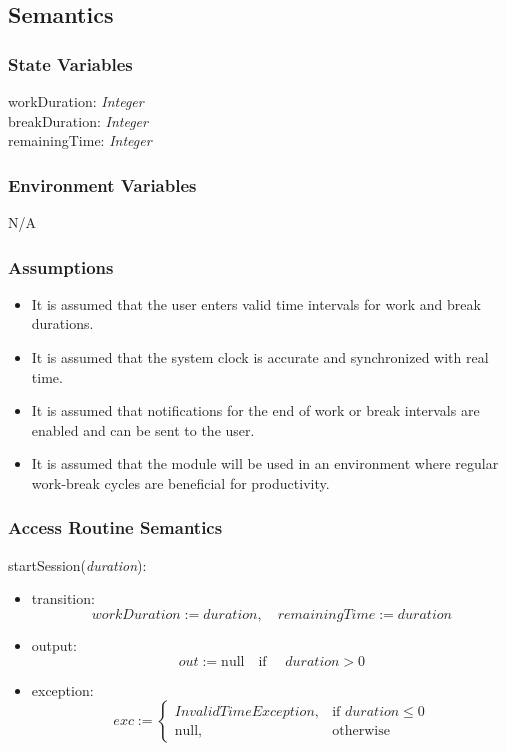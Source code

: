 \documentclass[12pt, titlepage]{article}
\begin{document}
\subsection{Semantics}

\subsubsection{State Variables}
workDuration: \textit{Integer}\\
breakDuration: \textit{Integer}\\
remainingTime: \textit{Integer}

\subsubsection{Environment Variables}
N/A

\subsubsection{Assumptions}
\begin{itemize}
  \item It is assumed that the user enters valid time intervals for work and break durations.
  \item It is assumed that the system clock is accurate and synchronized with real time.
  \item It is assumed that notifications for the end of work or break intervals are enabled and can be sent to the user.
  \item It is assumed that the module will be used in an environment where regular work-break cycles are beneficial for productivity.
\end{itemize}

\subsubsection{Access Routine Semantics}

\noindent startSession(\textit{duration}):
\begin{itemize}
\item transition: 
    \[
    workDuration := duration, \quad remainingTime := duration
    \]
\item output: 
    \[
    out := \text{null} \quad \text{if } \quad duration > 0
    \]
\item exception: 
    \[
    exc := \begin{cases} 
    InvalidTimeException, & \text{if } duration \leq 0 \\
    \text{null}, & \text{otherwise} 
    \end{cases}
    \]
\end{itemize}
\end{document}
